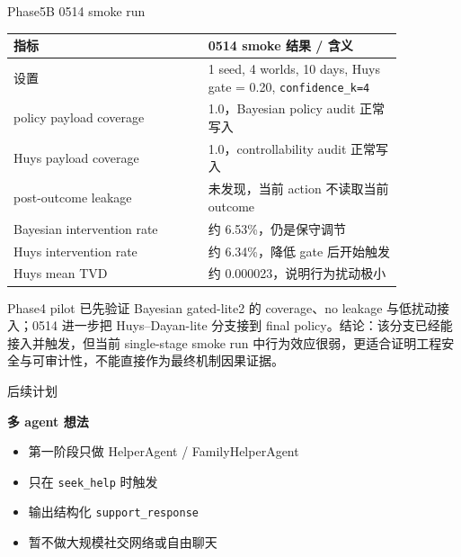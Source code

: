 \documentclass[aspectratio=169]{beamer}
\begin{document}
\begin{frame}[t]{Phase5B 0514 smoke run}
\small
\centering
\renewcommand{\arraystretch}{1.16}
\begin{tabular}{@{}L{0.43\linewidth}L{0.43\linewidth}@{}}
\toprule
指标 & 0514 smoke 结果 / 含义 \\
\midrule
设置 & 1 seed, 4 worlds, 10 days, Huys gate = 0.20, \texttt{confidence\_k=4} \\
policy payload coverage & 1.0，Bayesian policy audit 正常写入 \\
Huys payload coverage & 1.0，controllability audit 正常写入 \\
post-outcome leakage & 未发现，当前 action 不读取当前 outcome \\
Bayesian intervention rate & 约 6.53\%，仍是保守调节 \\
Huys intervention rate & 约 6.34\%，降低 gate 后开始触发 \\
Huys mean TVD & 约 0.000023，说明行为扰动极小 \\
\bottomrule
\end{tabular}

\vspace{0.32cm}
\begin{minipage}{0.88\textwidth}
 Phase4 pilot 已先验证 Bayesian gated-lite2 的 coverage、no leakage 与低扰动接入；0514 进一步把 Huys--Dayan-lite 分支接到 final policy。结论：该分支已经能接入并触发，但当前 single-stage smoke run 中行为效应很弱，更适合证明工程安全与可审计性，不能直接作为最终机制因果证据。
\end{minipage}
\end{frame}

\begin{frame}[t]{后续计划}
\small
\begin{minipage}{0.74\textwidth}
\textbf{多 agent 想法}
\begin{itemize}
    \item 第一阶段只做 HelperAgent / FamilyHelperAgent
    \item 只在 \texttt{seek\_help} 时触发
    \item 输出结构化 \texttt{support\_response}
    \item 暂不做大规模社交网络或自由聊天
\end{itemize}
\end{minipage}

\end{frame}
\end{document}
